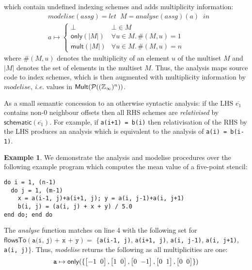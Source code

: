 \documentclass[10pt,preprint,numbers]{sigplanconf}
\newcounter{block}
\theoremstyle{definition}
\newtheorem{example}[block]{Example}
\newcommand{\ie}{\emph{i.e.}}
\newcommand{\vtwoh}[2]{\setlength{\arraycolsep}{0em}
\left[\begin{array}{cc}#1 \; & \; #2\end{array}\right]}
\begin{document}
which contain undefined indexing schemes and adds multiplicity
information:
%
\begin{align*}
& \mathit{modelise} (\textit{assg})
= \textit{let} \;\; M = \mathit{analyse}(\textit{assg}) (a) \;\; \textit{in}
\\
& a \mapsto
\begin{cases}
\bot & \bot \in M \\
\textsf{only}(|M|) & \forall u \in M . \, \#(M, u) = 1 \\
\textsf{mult}(|M|) & \forall u \in M . \, \#(M, u) = n
\end{cases}
\end{align*}
where $\#(M, u)$ denotes the multiplicity of an element $u$ of the
multiset $M$ and $|M|$ denotes the set of elements in the multiset
$M$.
Thus, the analysis maps source code to index schemes, which is then
augmented with multiplicity information by $\mathit{modelise}$,
\ie{} values in $\mathsf{Mult}(\mathcal{P}((\mathbb{Z}_\infty{})^n))$.

As a small semantic concession to an otherwise syntactic
analysis: if the LHS $\overline{e_1}$ contains non-$0$ neighbour offsets
then all RHS schemes are \emph{relativised} by
$\textsf{schematic}(\overline{e_1})$. For example,
if \texttt{a(i+1) = b(i)} then relativisation of the RHS by the LHS
produces an analysis which is equivalent to the analysis of \texttt{a(i) = b(i-1)}.

\begin{example}
\label{exm:checking}
We demonstrate the analysis and modelise procedures over the
following example program which computes the mean value
of a five-point stencil:
\begin{verbatim}
do i = 1, (n-1)
  do j = 1, (m-1)
    x = a(i-1, j)+a(i+1, j); y = a(i, j-1)+a(i, j+1)
    b(i, j) = (a(i, j) + x + y) / 5.0
end do; end do
\end{verbatim}
%
The \textit{analyse} function matches on
line 4 with the following set for $\textsf{flowsTo}(\texttt{a(i, j) + x +
  y}) = $
%
{{ %
$\{$\texttt{a(i-1, j)}, \texttt{a(i+1, j)}, \texttt{a(i, j-1)},
  \texttt{a(i, j+1)}, \texttt{a(i, j)}$\}$}}. 
Thus, \emph{modelise} returns the following
as all multiplicities are one:
\begin{align*}
\texttt{a} \mapsto \mathsf{only}(\{\vtwoh{-1}{0}, \vtwoh{1}{0},
          \vtwoh{0}{-1}, \vtwoh{0}{1}, \vtwoh{0}{0}\})
\end{align*}
\end{example}
\end{document}
